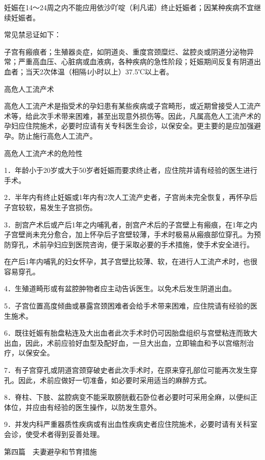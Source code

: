 \documentclass[12pt,UTF8]{ctexbook}
\begin{document}
妊娠在14～24周之内不能应用依沙吖啶（利凡诺）终止妊娠者；因某种疾病不宜继续妊娠者。

常见禁忌证如下：

子宫有瘢痕者；生殖器炎症，如阴道炎、重度宫颈糜烂、盆腔炎或阴道分泌物异常；严重高血压、心脏病或血液病，各种疾病的急性阶段；妊娠期间反复有阴道出血者；当天2次体温（相隔4小时以上）37.5℃以上者。





高危人工流产术


高危人工流产术是指受术的孕妇患有某些疾病或子宫畸形，或近期曾接受人工流产术等，给此次手术带来困难，甚至出现意外损伤等。因此，凡属高危人工流产术的孕妇应住院施术，必要时应请有关专科医生会诊，以保安全。更主要的是应加强避孕。防止施行高危人工流产。

高危人工流产术的危险性

1．年龄小于20岁或大于50岁者妊娠而要求终止者，应住院并请有经验的医生进行手术。

2．半年内有终止妊娠或1年内有2次人工流产史者，子宫尚未完全恢复，再怀孕后子宫较软，易发生子宫损伤。

3．剖宫产术后或产后1年之内哺乳者，剖宫产术后的子宫壁上有瘢痕，在1年之内子宫壁尚未充分愈合，加上怀孕后子宫壁较薄，手术时极易从瘢痕部位穿孔。为预防穿孔，术前孕妇应到医院咨询，便于采取必要的手术措施，使手术安全进行。

在产后1年内哺乳的妇女怀孕，其子宫壁比较薄、软，在进行人工流产术时，也很容易穿孔。

4．生殖道畸形或有盆腔肿物者应主动告诉医生。以免术后发生阴道出血。

5．子宫位置高度倾曲或暴露宫颈困难者会给手术带来困难，应住院请有经验的医生施术。

6．既往妊娠有胎盘粘连及大出血者此次手术时仍可因胎盘组织与宫壁粘连而致大出血，因此，术前应验好血型及配好血，一旦大出血，立即输血和予以宫缩剂治疗，以保安全。

7．有子宫穿孔或阴道宫颈穿破史者此次手术时，在原来穿孔部位可能再次发生穿孔。因此，术前应做好一切准备，如必要时采用适当的麻醉方式。

8．脊柱、下肢、盆腔病变不能采取膀胱截石卧位者必要时可采用全麻，以便纠正体位，并应由有经验的医生操作，以防发生意外。

9．并发内科严重器质性疾病或有出血性疾病史者应住院施术，必要时请有关科室会诊，使受术者得到妥善处理。





第四篇　夫妻避孕和节育措施
\end{document}
